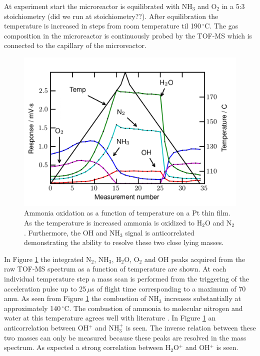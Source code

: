 \documentclass[aip,rsi]{revtex4-1}
\begin{document}
At experiment start the microreactor is equilibrated with NH$_3$ and O$_2$ in a 5:3 stoichiometry (did we run at stoichiometry??). After equilibration the temperature is increased in steps from room temperature til 190\,$^{\circ}$C. The gas composition in the microreactor is continuously probed by the TOF-MS which is connected to the capillary of the microreactor.
\begin{figure}
 \includegraphics[width=14cm]{ammonia_reactivity.png}%
 \caption{Ammonia oxidation as a function of temperature on a Pt thin film. As the temperature is increased ammonia is oxidized to H$_2$O and N$_2$. Furthermore, the OH and NH$_3$ signal is anticorrelated demonstrating the ability to resolve these two close lying masses.\label{fig:ammonia_reactivity}}%
\end{figure}
In Figure \ref{fig:ammonia_reactivity} the integrated N$_2$, NH$_3$, H$_2$O, O$_2$ and OH peaks acquired from the raw TOF-MS spectrum as a function of temperature are shown. At each individual temperature step a mass scan is performed from the triggering of the acceleration pulse up to 25\,$\mu$s of flight time corresponding to a maximum of 70 amu. As seen from Figure \ref{fig:ammonia_reactivity} the combustion of NH$_3$ increases substantially at approximately 140\,$^{\circ}$C. The combustion of ammonia to molecular nitrogen and water at this temperature agrees well with literature \cite{Imbihl2007,Zeng2009}. In Figure \ref{fig:ammonia_reactivity} an anticorrelation between OH$^{+}$ and NH$_3^+$ is seen. The inverse relation between these two masses can only be measured because these peaks are resolved in the mass spectrum. As expected a strong correlation between H$_2$O$^{+}$ and OH$^+$ is seen.
\end{document}
